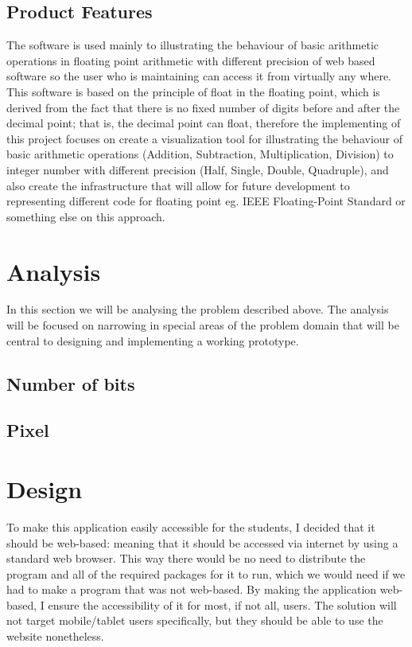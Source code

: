 \documentclass[11pt]{article}
\begin{document}
\subsection{Product Features}%
The software is used mainly to illustrating the behaviour of basic arithmetic operations in floating point arithmetic with different precision of web based software so the user who is maintaining can access it from virtually any where.\\

This software is based on the principle of float in the floating point, which is derived from the fact that there is no fixed number of digits before and after the decimal point; that is, the decimal point can float, therefore the implementing of this project focuses on create a visualization tool for illustrating the behaviour of basic arithmetic operations (Addition, Subtraction, Multiplication, Division) to integer number with different precision (Half, Single, Double, Quadruple), and also create the infrastructure that will allow for future development to representing different code for floating point eg. IEEE Floating-Point Standard or something else on this approach.

\section{Analysis}
In this section we will be analysing the problem described above. The analysis will be focused on narrowing in special areas of the problem domain that will be central to designing and implementing a working prototype.
\subsection{Number of bits}%
\subsection{Pixel}%

\section{Design}
To make this application easily accessible for the students, I decided that it should be web-based: meaning that it should be accessed via internet by using a standard web browser. This way there would be no need to distribute the program and all of the required packages for it to run, which we would need if we had to make a program that was not web-based. By making the application web-based, I ensure the accessibility of it for most, if not all, users. The solution will not target mobile/tablet users specifically, but they should be able to use the website nonetheless.
\end{document}

